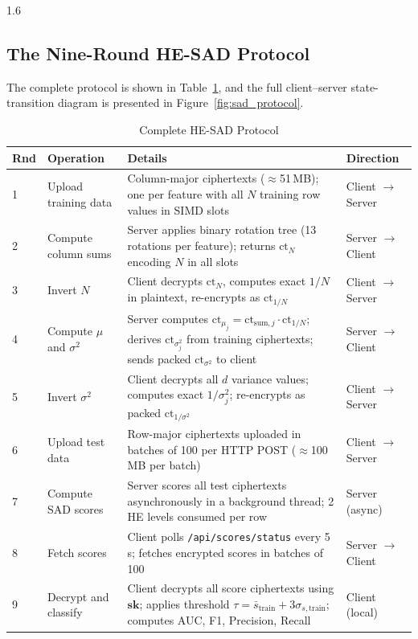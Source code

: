\begin{spacing}{1.6}

\subsection{The Nine-Round HE-SAD Protocol}

The complete protocol is shown in Table~\ref{tab:sad_proto}, and the full
client--server state-transition diagram is presented in
Figure~\ref{fig:sad_protocol}.

\end{spacing}

\begin{table}[!ht]
\centering
\caption{Complete HE-SAD Protocol}
\label{tab:sad_proto}
\begin{tabular}{p{0.6cm}p{2.8cm}p{7.2cm}p{2.5cm}}
\toprule
\textbf{Rnd} & \textbf{Operation} & \textbf{Details} & \textbf{Direction} \\
\midrule
1 & Upload training data &
  Column-major ciphertexts ($\approx$51\,MB); one per feature with all
  $N$ training row values in SIMD slots &
  Client $\to$ Server \\[4pt]
2 & Compute column sums &
  Server applies binary rotation tree (13 rotations per feature);
  returns $\mathrm{ct}_N$ encoding $N$ in all slots &
  Server $\to$ Client \\[4pt]
3 & Invert $N$ &
  Client decrypts $\mathrm{ct}_N$, computes exact $1/N$ in plaintext,
  re-encrypts as $\mathrm{ct}_{1/N}$ &
  Client $\to$ Server \\[4pt]
4 & Compute $\mu$ and $\sigma^2$ &
  Server computes $\mathrm{ct}_{\mu_j} = \mathrm{ct}_{\mathrm{sum},j}
  \cdot \mathrm{ct}_{1/N}$; derives $\mathrm{ct}_{\sigma^2_j}$ from
  training ciphertexts; sends packed $\mathrm{ct}_{\sigma^2}$ to client &
  Server $\to$ Client \\[4pt]
5 & Invert $\sigma^2$ &
  Client decrypts all $d$ variance values; computes exact
  $1/\sigma_j^2$; re-encrypts as packed $\mathrm{ct}_{1/\sigma^2}$ &
  Client $\to$ Server \\[4pt]
6 & Upload test data &
  Row-major ciphertexts uploaded in batches of 100 per HTTP POST
  ($\approx$100\,MB per batch) &
  Client $\to$ Server \\[4pt]
7 & Compute SAD scores &
  Server scores all test ciphertexts asynchronously in a background
  thread; 2 HE levels consumed per row &
  Server (async) \\[4pt]
8 & Fetch scores &
  Client polls \texttt{/api/scores/status} every 5\,s; fetches
  encrypted scores in batches of 100 &
  Server $\to$ Client \\[4pt]
9 & Decrypt and classify &
  Client decrypts all score ciphertexts using $\mathbf{sk}$; applies
  threshold $\tau = \bar{s}_\mathrm{train} + 3\sigma_{s,\mathrm{train}}$;
  computes AUC, F1, Precision, Recall &
  Client (local) \\
\bottomrule
\end{tabular}
\end{table}

